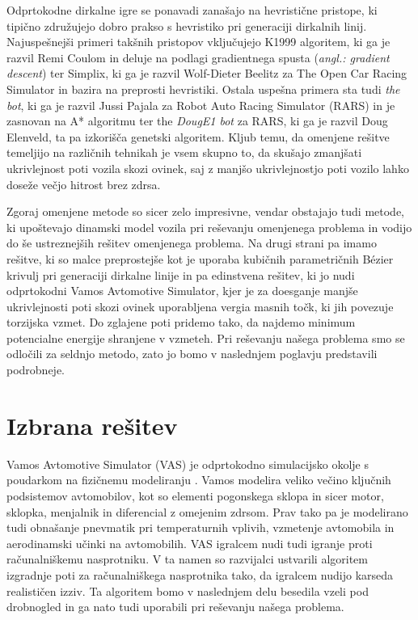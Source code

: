 \documentclass[10pt,a4paper]{article}
\begin{document}
Odprtokodne dirkalne igre se ponavadi zanašajo na hevristične pristope, ki tipično združujejo dobro prakso s hevristiko pri generaciji dirkalnih linij. Najuspešnejši primeri takšnih pristopov vključujejo K1999 algoritem, ki ga je razvil Remi Coulom in deluje na podlagi gradientnega spusta (\textit{angl.: gradient descent}) ter Simplix, ki ga je razvil Wolf-Dieter Beelitz za The Open Car Racing Simulator in bazira na preprosti hevristiki. Ostala uspešna primera sta tudi \textit{the bot}, ki ga je razvil Jussi Pajala za Robot Auto Racing Simulator (RARS) in je zasnovan na A* algoritmu ter the \textit{DougE1 bot} za RARS, ki ga je razvil Doug Elenveld, ta pa izkorišča genetski algoritem. Kljub temu, da omenjene rešitve temeljijo na različnih tehnikah je vsem skupno to, da skušajo zmanjšati ukrivlejnost poti vozila skozi ovinek, saj z manjšo ukrivlejnostjo poti vozilo lahko doseže večjo hitrost brez zdrsa.

Zgoraj omenjene metode so sicer zelo impresivne, vendar obstajajo tudi metode, ki upoštevajo dinamski model vozila pri reševanju omenjenega problema in vodijo do še ustreznejših rešitev omenjenega problema. Na drugi strani pa imamo rešitve, ki so malce preprostejše kot je uporaba kubičnih parametričnih Bézier krivulj pri generaciji dirkalne linije in pa edinstvena rešitev, ki jo nudi odprtokodni Vamos Avtomotive Simulator, kjer je za doesganje manjše ukrivlejnosti poti skozi ovinek uporabljena vergia masnih točk, ki jih povezuje torzijska vzmet. Do zglajene poti pridemo tako, da najdemo minimum potencialne energije shranjene v vzmeteh. Pri reševanju našega problema smo se odločili za seldnjo metodo, zato jo bomo v naslednjem poglavju predstavili podrobneje.

\section{Izbrana rešitev}

Vamos Avtomotive Simulator (VAS) je odprtokodno simulacijsko okolje s poudarkom na fizičnemu modeliranju \cite{VAS}. Vamos modelira veliko večino ključnih podsistemov avtomobilov, kot so elementi pogonskega sklopa in sicer motor, sklopka, menjalnik in diferencial z omejenim zdrsom. Prav tako pa je modelirano tudi obnašanje pnevmatik pri temperaturnih vplivih, vzmetenje avtomobila in aerodinamski učinki na avtomobilih. VAS igralcem nudi tudi igranje proti računalniškemu nasprotniku. V ta namen so razvijalci ustvarili algoritem izgradnje poti za računalniškega nasprotnika tako, da igralcem nudijo karseda realističen izziv. Ta algoritem bomo v naslednjem delu besedila vzeli pod drobnogled in ga nato tudi uporabili pri reševanju našega problema.
\end{document}
